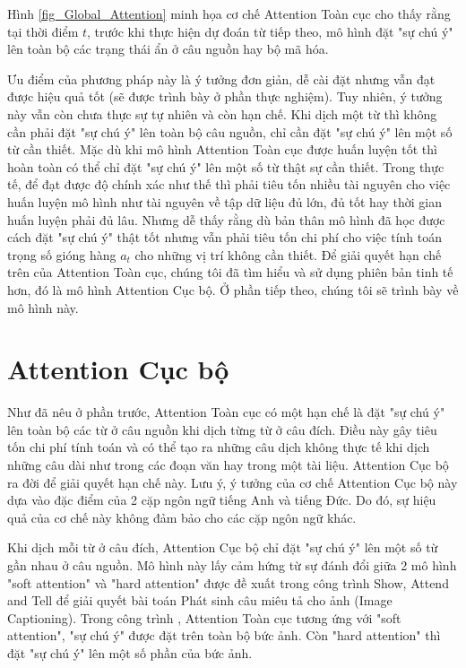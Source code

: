 Hình \ref{fig_Global_Attention} minh họa cơ chế Attention Toàn cục cho thấy rằng tại thời điểm $t$, trước khi thực hiện dự đoán từ tiếp theo, mô hình đặt "sự chú ý" lên toàn bộ các trạng thái ẩn ở câu nguồn hay bộ mã hóa.

Ưu điểm của phương pháp này là ý tưởng đơn giản, dễ cài đặt nhưng vẫn đạt được hiệu quả tốt (sẽ được trình bày ở phần thực nghiệm). Tuy nhiên, ý tưởng này vẫn còn chưa thực sự tự nhiên và còn hạn chế. Khi dịch một từ thì không cần phải đặt "sự chú ý" lên toàn bộ câu nguồn, chỉ cần đặt "sự chú ý" lên một số từ cần thiết. Mặc dù khi mô hình Attention Toàn cục được huấn luyện tốt thì hoàn toàn có thể chỉ đặt "sự chú ý" lên một số từ thật sự cần thiết. Trong thực tế, để đạt được độ chính xác như thế thì phải tiêu tốn nhiều tài nguyên cho việc huấn luyện mô hình như tài nguyên về tập dữ liệu đủ lớn, đủ tốt hay thời gian huấn luyện phải đủ lâu. Nhưng dễ thấy rằng dù bản thân mô hình đã học được cách đặt "sự chú ý" thật tốt nhưng vẫn phải tiêu tốn chi phí cho việc tính toán trọng số gióng hàng $a_t$ cho những vị trí không cần thiết.
Để giải quyết hạn chế trên của Attention Toàn cục, chúng tôi đã tìm hiểu và sử dụng phiên bản tinh tế hơn, đó là mô hình Attention Cục bộ. Ở phần tiếp theo, chúng tôi sẽ trình bày về mô hình này.

\section{Attention Cục bộ}
Như đã nêu ở phần trước, Attention Toàn cục có một hạn chế là đặt "sự chú ý" lên toàn bộ các từ ở câu nguồn khi dịch từng từ ở câu đích. Điều này gây tiêu tốn chi phí tính toán và có thể tạo ra những câu dịch không thực tế khi dịch những câu dài như trong các đoạn văn hay trong một tài liệu. Attention Cục bộ ra đời để giải quyết hạn chế này. Lưu ý, ý tưởng của cơ chế Attention Cục bộ này dựa vào đặc điểm của 2 cặp ngôn ngữ tiếng Anh và tiếng Đức. Do đó, sự hiệu quả của cơ chế này không đảm bảo cho các cặp ngôn ngữ khác.

Khi dịch mỗi từ ở câu đích, Attention Cục bộ chỉ đặt "sự chú ý" lên một số từ gần nhau ở câu nguồn. Mô hình này lấy cảm hứng từ sự đánh đổi giữa 2 mô hình "soft attention" và "hard attention" được đề xuất trong công trình Show, Attend and Tell \cite{showattendandtellXu2015} để giải quyết bài toán Phát sinh câu miêu tả cho ảnh (Image Captioning). Trong công trình \cite{showattendandtellXu2015}, Attention Toàn cục tương ứng với "soft attention", "sự chú ý" được đặt trên toàn bộ bức ảnh. Còn "hard attention" thì đặt "sự chú ý" lên một số phần của bức ảnh.

